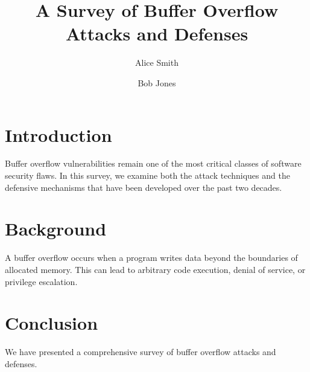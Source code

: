\documentclass{article}
\title{A Survey of Buffer Overflow Attacks and Defenses}
\author{Alice Smith \and Bob Jones}
\begin{document}
\maketitle

\section{Introduction}
Buffer overflow vulnerabilities remain one of the most critical classes of
software security flaws. In this survey, we examine both the attack techniques
and the defensive mechanisms that have been developed over the past two decades.

\section{Background}
A buffer overflow occurs when a program writes data beyond the boundaries of
allocated memory. This can lead to arbitrary code execution, denial of service,
or privilege escalation.

\section{Conclusion}
We have presented a comprehensive survey of buffer overflow attacks and defenses.
\end{document}
